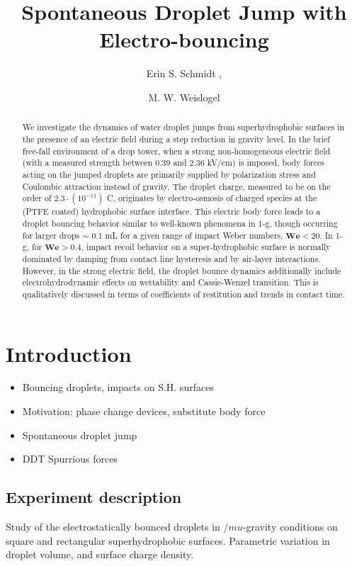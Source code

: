 \documentclass{jfm}
\title{Spontaneous Droplet Jump with Electro-bouncing}
\author{Erin S. Schmidt\aff{1}
  \corresp{\email{esch2@pdx.edu}},
 \and M. W.  Weislogel\aff{1}}
\affiliation{\aff{1}Department of Mechanical Engineering, Portland State University,
Portland, OR 97211, USA
}
\begin{document}
\maketitle

\begin{abstract}
We investigate the dynamics of water droplet jumps from superhydrophobic surfaces in the presence of an electric field during a step reduction in gravity level. In the brief free-fall environment of a drop tower, when a strong non-homogeneous electric field (with a measured strength between $0.39$ and $2.36$ kV/cm) is imposed, body forces acting on the jumped droplets are primarily supplied by polarization stress and Coulombic attraction instead of gravity. The droplet charge, measured to be on the order of $2.3 \cdot(10^{-11})$ C, originates by electro-osmosis of charged species at the (PTFE coated) hydrophobic surface interface. This electric body force leads to a droplet bouncing behavior similar to well-known phenomena in 1-g, though occurring for larger drops $\sim \! \!$ 0.1 mL for a given range of impact Weber numbers, $\mathbf{We} < 20$. In 1-g, for $\mathbf{We} > 0.4$, impact recoil behavior on a super-hydrophobic surface is normally dominated by damping from contact line hysteresis and by air-layer interactions. However, in the strong electric field, the droplet bounce dynamics additionally include electrohydrodynamic effects on wettability and Cassie-Wenzel transition. This is qualitatively discussed in terms of coefficients of restitution and trends in contact time. \end{abstract}

\section{Introduction}\label{sec:intro}
\begin{itemize}
\item Bouncing droplets, impacts on S.H. surfaces
\item Motivation: phase change devices, substitute body force
\item Spontaneous droplet jump
\item DDT Spurrious forces
\end{itemize}

\subsection{Experiment description}
Study of the electrostatically bounced droplets in $/mu$-gravity conditions on square and rectangular superhydrophobic surfaces. Parametric variation in droplet volume, and surface charge density.
\end{document}
